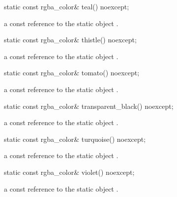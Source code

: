 \begin{itemdecl}
static const rgba_color& teal() noexcept;
\end{itemdecl}
\begin{itemdescr}
\pnum
\returns
a const reference to the static  object .
\end{itemdescr}

\begin{itemdecl}
static const rgba_color& thistle() noexcept;
\end{itemdecl}
\begin{itemdescr}
\pnum
\returns
a const reference to the static  object .
\end{itemdescr}

\begin{itemdecl}
static const rgba_color& tomato() noexcept;
\end{itemdecl}
\begin{itemdescr}
\pnum
\returns
a const reference to the static  object .
\end{itemdescr}

\begin{itemdecl}
static const rgba_color& transparent_black() noexcept;
\end{itemdecl}
\begin{itemdescr}
\pnum
\returns
a const reference to the static  object .
\end{itemdescr}

\begin{itemdecl}
static const rgba_color& turquoise() noexcept;
\end{itemdecl}
\begin{itemdescr}
\pnum
\returns
a const reference to the static  object .
\end{itemdescr}

\begin{itemdecl}
static const rgba_color& violet() noexcept;
\end{itemdecl}
\begin{itemdescr}
\pnum
\returns
a const reference to the static  object .
\end{itemdescr}

